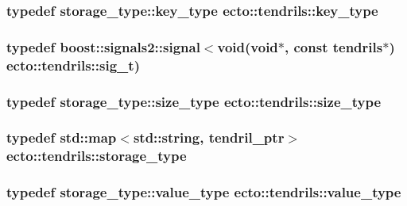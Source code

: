 \hypertarget{classecto_1_1tendrils_aa6165c6ab72d93cd56796ea81e450245}{
\subsubsection[{key\-\_\-type}]{\setlength{\rightskip}{0pt plus 5cm}typedef storage\-\_\-type\-::key\-\_\-type {\bf ecto\-::tendrils\-::key\-\_\-type}}}\label{classecto_1_1tendrils_aa6165c6ab72d93cd56796ea81e450245}
\hypertarget{classecto_1_1tendrils_aa898408b75690dffde72989cdeaf03e6}{
\subsubsection[{sig\-\_\-t}]{\setlength{\rightskip}{0pt plus 5cm}typedef boost\-::signals2\-::signal$<$void(void$\ast$, const {\bf tendrils}$\ast$) {\bf ecto\-::tendrils\-::sig\-\_\-t})}}\label{classecto_1_1tendrils_aa898408b75690dffde72989cdeaf03e6}
\hypertarget{classecto_1_1tendrils_af3726f822a4fd60a1095bba31f1926ef}{
\subsubsection[{size\-\_\-type}]{\setlength{\rightskip}{0pt plus 5cm}typedef storage\-\_\-type\-::size\-\_\-type {\bf ecto\-::tendrils\-::size\-\_\-type}}}\label{classecto_1_1tendrils_af3726f822a4fd60a1095bba31f1926ef}
\hypertarget{classecto_1_1tendrils_a3647503829f1b29de220584d265c63fb}{
\subsubsection[{storage\-\_\-type}]{\setlength{\rightskip}{0pt plus 5cm}typedef std\-::map$<$std\-::string, {\bf tendril\-\_\-ptr}$>$ {\bf ecto\-::tendrils\-::storage\-\_\-type}}}\label{classecto_1_1tendrils_a3647503829f1b29de220584d265c63fb}
\hypertarget{classecto_1_1tendrils_a736870868e76890e198448924cecdd4f}{
\subsubsection[{value\-\_\-type}]{\setlength{\rightskip}{0pt plus 5cm}typedef storage\-\_\-type\-::value\-\_\-type {\bf ecto\-::tendrils\-::value\-\_\-type}}}\label{classecto_1_1tendrils_a736870868e76890e198448924cecdd4f}


